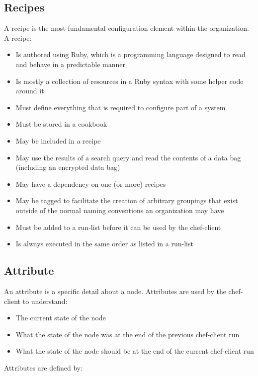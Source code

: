 \subsection{Recipes}

A recipe is the most fundamental configuration element within the organization. A recipe:

\begin{itemize}
  \item Is authored using Ruby, which is a programming language designed to read and behave in a predictable manner
  \item Is mostly a collection of resources in a Ruby syntax with some helper code around it
  \item Must define everything that is required to configure part of a system
  \item Must be stored in a cookbook
  \item May be included in a recipe
  \item May use the results of a search query and read the contents of a data bag (including an encrypted data bag)
  \item May have a dependency on one (or more) recipes
  \item May be tagged to facilitate the creation of arbitrary groupings that exist outside of the normal naming conventions an organization may have
  \item Must be added to a run-list before it can be used by the chef-client
  \item Is always executed in the same order as listed in a run-list
\end{itemize}

\subsection{Attribute}

An attribute is a specific detail about a node. Attributes are used by the chef-client to understand:

\begin{itemize}
  \item The current state of the node
  \item What the state of the node was at the end of the previous chef-client run
  \item What the state of the node should be at the end of the current chef-client run
\end{itemize}

Attributes are defined by:

